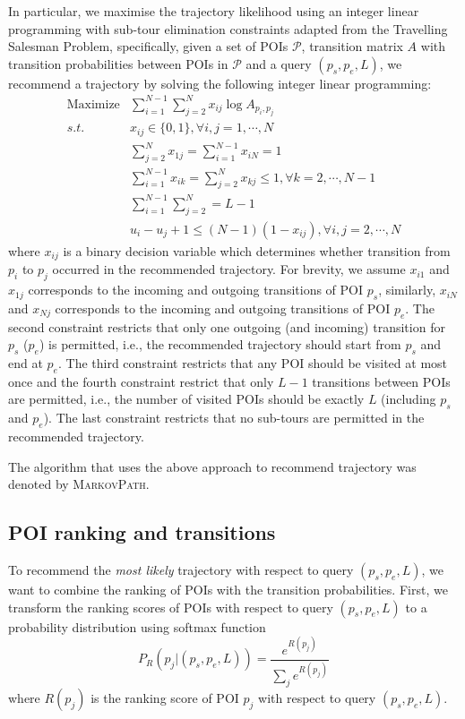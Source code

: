 In particular, we maximise the trajectory likelihood using an integer linear programming with 
sub-tour elimination constraints adapted from the Travelling Salesman Problem\cite{opt98},
specifically, given a set of POIs $\mathcal{P}$, transition matrix $A$ with transition probabilities
between POIs in $\mathcal{P}$ and a query $(p_s, p_e, L)$, 
we recommend a trajectory by solving the following integer linear programming:
\begin{align*}
\text{Maximize} & \sum_{i=1}^{N-1} \sum_{j=2}^N x_{ij} \log A_{p_i, p_j} \\
s.t. & x_{ij} \in \{0, 1\}, \forall i, j = 1, \cdots, N \\
     & \sum_{j=2}^N x_{1j} = \sum_{i=1}^{N-1} x_{iN} = 1 \\
     & \sum_{i=1}^{N-1} x_{ik} = \sum_{j=2}^N x_{kj} \le 1, \forall k=2, \cdots, N-1 \\
     & \sum_{i=1}^{N-1} \sum_{j=2}^N = L-1 \\
     & u_i - u_j + 1 \le (N-1) (1-x_{ij}), \forall i, j = 2, \cdots, N
\end{align*}
where $x_{ij}$ is a binary decision variable which determines whether transition from $p_i$ to $p_j$
occurred in the recommended trajectory.
For brevity, we assume $x_{i1}$ and $x_{1j}$ corresponds to the incoming and outgoing transitions of POI $p_s$, 
similarly, $x_{iN}$ and $x_{Nj}$ corresponds to the incoming and outgoing transitions of POI $p_e$.
The second constraint restricts that only one outgoing (and incoming) transition for $p_s$ ($p_e$)
is permitted, i.e., the recommended trajectory should start from $p_s$ and end at $p_e$.
The third constraint restricts that any POI should be visited at most once and the fourth constraint
restrict that only $L-1$ transitions between POIs are permitted, i.e., the number of visited POIs should be
exactly $L$ (including $p_s$ and $p_e$).
The last constraint restricts that no sub-tours are permitted in the recommended trajectory.

The algorithm that uses the above approach to recommend trajectory was denoted by \textsc{MarkovPath}.


\subsection{POI ranking and transitions}
To recommend the \textit{most likely} trajectory with respect to query $(p_s, p_e, L)$,
we want to combine the ranking of POIs with the transition probabilities.
First, we transform the ranking scores of POIs with respect to query $(p_s, p_e, L)$
to a probability distribution using softmax function
\begin{displaymath}
    P_R(p_j |(p_s, p_e, L)) = \frac{e^{R(p_j)}}{\sum_j e^{R(p_j)}}
\end{displaymath}
where $R(p_j)$ is the ranking score of POI $p_j$ with respect to query $(p_s, p_e, L)$.

